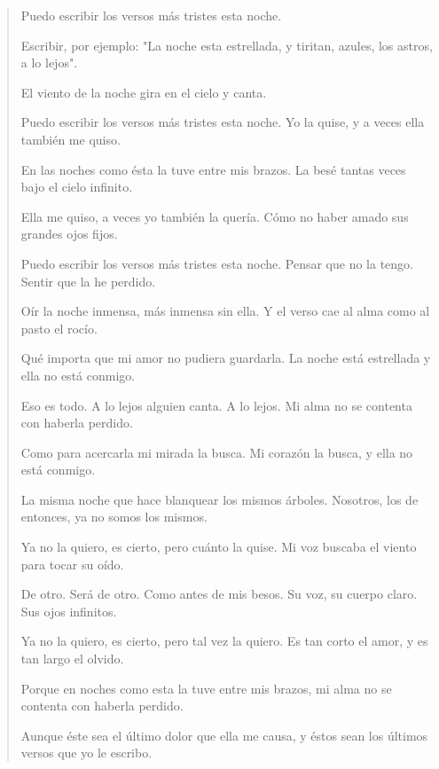 \documentclass[12pt]{article}
\begin{document}
\clearpage
{}
\begin{verse}
Puedo escribir los versos más tristes esta noche.  
	
Escribir, por ejemplo: "La noche esta estrellada,  
y tiritan, azules, los astros, a lo lejos".  
	
El viento de la noche gira en el cielo y canta.  
	
Puedo escribir los versos más tristes esta noche.  
Yo la quise, y a veces ella también me quiso.  
	
En las noches como ésta la tuve entre mis brazos.  
La besé tantas veces bajo el cielo infinito.  
	
Ella me quiso, a veces yo también la quería.  
Cómo no haber amado sus grandes ojos fijos.  
	
Puedo escribir los versos más tristes esta noche.  
Pensar que no la tengo. Sentir que la he perdido.  
	
Oír la noche inmensa, más inmensa sin ella.  
Y el verso cae al alma como al pasto el rocío.  
	
Qué importa que mi amor no pudiera guardarla.  
La noche está estrellada y ella no está conmigo.  
	
Eso es todo. A lo lejos alguien canta. A lo lejos.  
Mi alma no se contenta con haberla perdido.  
	
Como para acercarla mi mirada la busca.  
Mi corazón la busca, y ella no está conmigo.  
	
La misma noche que hace blanquear los mismos árboles.  
Nosotros, los de entonces, ya no somos los mismos.  
	
Ya no la quiero, es cierto, pero cuánto la quise.  
Mi voz buscaba el viento para tocar su oído.  
	
De otro. Será de otro. Como antes de mis besos.  
Su voz, su cuerpo claro. Sus ojos infinitos.  
	
Ya no la quiero, es cierto, pero tal vez la quiero.  
Es tan corto el amor, y es tan largo el olvido.  
	
Porque en noches como esta la tuve entre mis brazos,  
mi alma no se contenta con haberla perdido.  
	
Aunque éste sea el último dolor que ella me causa,  
y éstos sean los últimos versos que yo le escribo.

\end{verse}
\end{document}
